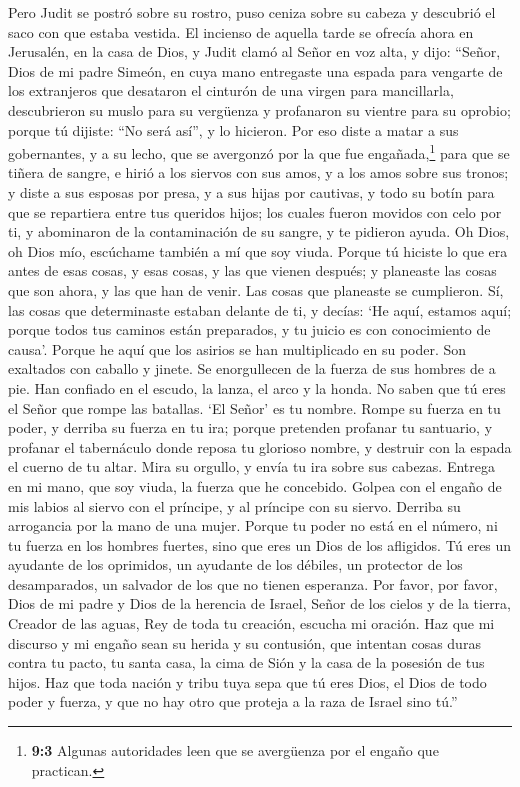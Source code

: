  Pero Judit se postró sobre su rostro, puso ceniza sobre
su cabeza y descubrió el saco con que estaba vestida. El incienso de
aquella tarde se ofrecía ahora en Jerusalén, en la casa de Dios, y Judit
clamó al Señor en voz alta, y dijo:  ``Señor, Dios de mi
padre Simeón, en cuya mano entregaste una espada para vengarte de los
extranjeros que desataron el cinturón de una virgen para mancillarla,
descubrieron su muslo para su vergüenza y profanaron su vientre para su
oprobio; porque tú dijiste: ``No será así'', y lo hicieron.
 Por eso diste a matar a sus gobernantes, y a su lecho,
que se avergonzó por la que fue engañada,\footnote{\textbf{9:3} Algunas
  autoridades leen que se avergüenza por el engaño que practican.} para
que se tiñera de sangre, e hirió a los siervos con sus amos, y a los
amos sobre sus tronos;  y diste a sus esposas por presa, y
a sus hijas por cautivas, y todo su botín para que se repartiera entre
tus queridos hijos; los cuales fueron movidos con celo por ti, y
abominaron de la contaminación de su sangre, y te pidieron ayuda. Oh
Dios, oh Dios mío, escúchame también a mí que soy viuda. 
Porque tú hiciste lo que era antes de esas cosas, y esas cosas, y las
que vienen después; y planeaste las cosas que son ahora, y las que han
de venir. Las cosas que planeaste se cumplieron.  Sí, las
cosas que determinaste estaban delante de ti, y decías: `He aquí,
estamos aquí; porque todos tus caminos están preparados, y tu juicio es
con conocimiento de causa'.  Porque he aquí que los
asirios se han multiplicado en su poder. Son exaltados con caballo y
jinete. Se enorgullecen de la fuerza de sus hombres de a pie. Han
confiado en el escudo, la lanza, el arco y la honda. No saben que tú
eres el Señor que rompe las batallas. `El Señor' es tu nombre.
 Rompe su fuerza en tu poder, y derriba su fuerza en tu
ira; porque pretenden profanar tu santuario, y profanar el tabernáculo
donde reposa tu glorioso nombre, y destruir con la espada el cuerno de
tu altar.  Mira su orgullo, y envía tu ira sobre sus
cabezas. Entrega en mi mano, que soy viuda, la fuerza que he concebido.
 Golpea con el engaño de mis labios al siervo con el
príncipe, y al príncipe con su siervo. Derriba su arrogancia por la mano
de una mujer.  Porque tu poder no está en el número, ni
tu fuerza en los hombres fuertes, sino que eres un Dios de los
afligidos. Tú eres un ayudante de los oprimidos, un ayudante de los
débiles, un protector de los desamparados, un salvador de los que no
tienen esperanza.  Por favor, por favor, Dios de mi padre
y Dios de la herencia de Israel, Señor de los cielos y de la tierra,
Creador de las aguas, Rey de toda tu creación, escucha mi oración.
 Haz que mi discurso y mi engaño sean su herida y su
contusión, que intentan cosas duras contra tu pacto, tu santa casa, la
cima de Sión y la casa de la posesión de tus hijos.  Haz
que toda nación y tribu tuya sepa que tú eres Dios, el Dios de todo
poder y fuerza, y que no hay otro que proteja a la raza de Israel sino
tú.''

